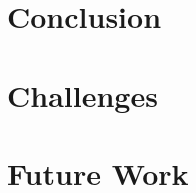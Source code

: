
\newcommand*{\future}{chapters/future/}

\section{Conclusion}
	
\section{Challenges}
	
\section{Future Work}
	
